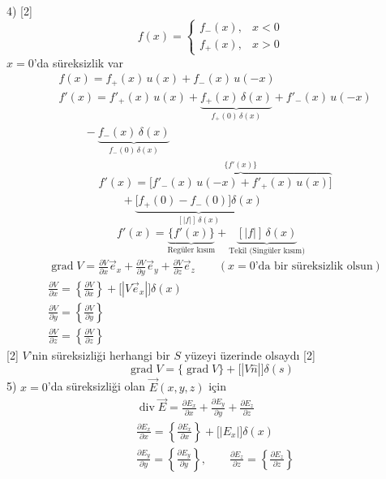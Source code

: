 \documentclass[11pt,a4paper]{article}
\begin{document}
4)
[2]
\[ f(x)=\begin{cases}f_-(x), & x<0\\ f_+(x), & x>0\end{cases} \]
$x=0$'da süreksizlik var
\begin{align*}
&f(x)=f_+(x)\,u(x)+f_-(x)\,u(-x)\\
&f'(x)=f'_+(x)\,u(x)+\underbrace{f_+(x)\,\delta(x)}_{f_+(0)\,\delta(x)}+f'_-(x)\,u(-x)\\
&\qquad\ -\underbrace{f_-(x)\,\delta(x)}_{f_-(0)\,\delta(x)}
\end{align*}
\begin{align*}
&f'(x)=\overbrace{\bigl[f'_-(x)\,u(-x)+f'_+(x)\,u(x)\bigr]}^{\{f'(x)\}}\\
&\qquad+\underbrace{\bigl[f_+(0)-f_-(0)\bigr]\delta(x)}_{[|f|]\,\delta(x)}
\end{align*}
\[ f'(x)=\underbrace{\{f'(x)\}}_{\text{Regüler kısım}}+\underbrace{[|f|]\,\delta(x)}_{\text{Tekil (Singüler kısım)}} \]
\begin{align*}
&\operatorname{grad}V=\frac{\partial V}{\partial x}\vec e_x+\frac{\partial V}{\partial y}\vec e_y+\frac{\partial V}{\partial z}\vec e_z\qquad (x=0\text{'da bir süreksizlik olsun})\\
&\frac{\partial V}{\partial x}=\left\{\frac{\partial V}{\partial x}\right\}+\bigl[|V\vec e_x|\bigr]\delta(x)\\
&\frac{\partial V}{\partial y}=\left\{\frac{\partial V}{\partial y}\right\}\\
&\frac{\partial V}{\partial z}=\left\{\frac{\partial V}{\partial z}\right\}
\end{align*}
[2]
$V$'nin süreksizliği herhangi bir $S$ yüzeyi üzerinde olsaydı
[2]
\[ \operatorname{grad}V=\{\operatorname{grad}V\}+\bigl[|V\hat n|\bigr]\delta(s) \]
5) $x=0$'da süreksizliği olan $\vec E(x,y,z)$ için
\begin{align*}
&\operatorname{div}\vec E=\frac{\partial E_x}{\partial x}+\frac{\partial E_y}{\partial y}+\frac{\partial E_z}{\partial z}\\
&\frac{\partial E_x}{\partial x}=\left\{\frac{\partial E_x}{\partial x}\right\}+\bigl[|E_x|\bigr]\delta(x)\\
&\frac{\partial E_y}{\partial y}=\left\{\frac{\partial E_y}{\partial y}\right\},\qquad \frac{\partial E_z}{\partial z}=\left\{\frac{\partial E_z}{\partial z}\right\}
\end{align*}
\end{document}
